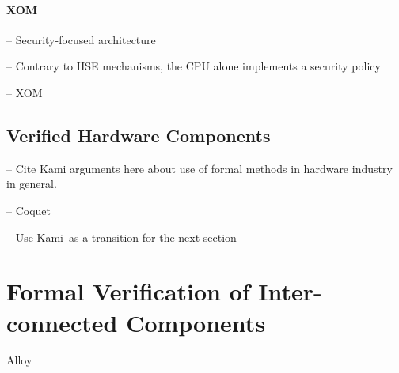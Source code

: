 \paragraph{XOM}
%
\begin{compactitem}
\item[--] Security-focused architecture
\item[--] Contrary to HSE mechanisms, the CPU alone implements a security policy
\item[--] XOM\,\cite{lie2003xom}
\end{compactitem}


\subsection{Verified Hardware Components}

\begin{compactitem}
\item[--] Cite Kami arguments here about use of formal methods in hardware
  industry in general.
\end{compactitem}

\begin{compactitem}
\item[--] Coquet\,\cite{braibant2011coquet}
\item[--] Use Kami\,\cite{choi2017kami} as a transition for the next section
\end{compactitem}

\section{Formal Verification of Inter-connected Components} %
\label{sec:relatedwork:modular}

\begin{compactitem}
\item Alloy\,\cite{jackson2012alloy}
\end{compactitem}
